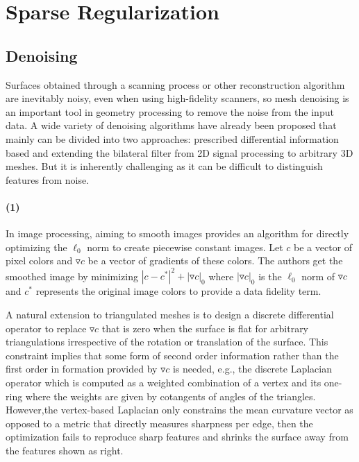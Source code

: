 \section{Sparse Regularization}
\label{sec:Sparse Regularization}

\subsection{Denoising}
\label{subsec:L0 denoising}

Surfaces obtained through a scanning process or other reconstruction algorithm are inevitably noisy, even when using high-fidelity scanners,
so mesh denoising is an important tool in geometry processing to remove the noise from the input data.
A wide variety of denoising algorithms have already been proposed that mainly can be divided into two approaches:
prescribed differential information based and extending the bilateral filter from 2D signal processing to arbitrary 3D meshes.
But it is inherently challenging as it can be difficult to distinguish features from noise.

\paragraph{(1)}
In image processing, \cite{xu2011image} aiming to smooth images provides an algorithm for directly optimizing the $\ell_0$ norm to create piecewise constant images.
Let $c$ be a vector of pixel colors and $\triangledown c$ be a vector of gradients of these colors.
The authors get the smoothed image by minimizing $|c-c^{*}|^2+|\triangledown c|_0$ where $|\triangledown c|_0$ is the $\ell_0$ norm of $\triangledown c$
and $c^{*}$ represents the original image colors to provide a data fidelity term.

A natural extension to triangulated meshes is to design a discrete differential operator to replace $\triangledown c$ that is zero when the surface is flat for arbitrary triangulations irrespective of the rotation or translation of the surface.
This constraint implies that some form of second order information rather than the first order in formation provided by $\triangledown c$ is needed, e.g.,  the discrete Laplacian operator\cite{pinkall1993computing} which is computed as a weighted combination of a vertex and its one-ring where the weights are given by cotangents of angles of the triangles.
However,the vertex-based Laplacian only constrains the mean curvature vector as opposed to a metric that directly measures sharpness per edge, then the optimization fails to reproduce sharp features and shrinks the surface away from the features shown as right.

